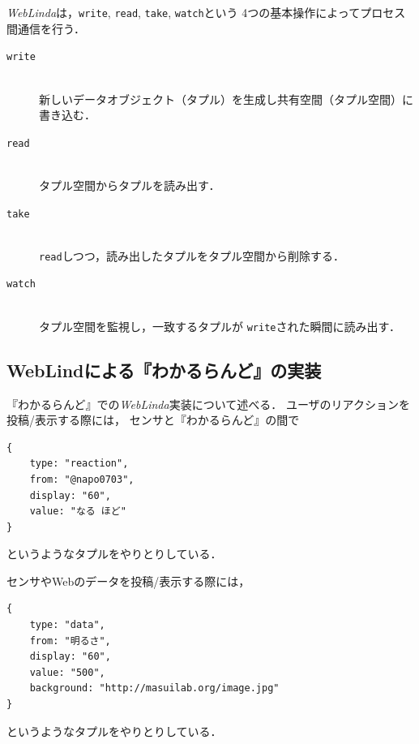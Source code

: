 \textit{WebLinda}は，\texttt{write}, \texttt{read}, \texttt{take}, \texttt{watch}という
4つの基本操作によってプロセス間通信を行う．

\vspace{2mm}
\begin{description}
\item[\texttt{write}]\mbox{}\\
新しいデータオブジェクト（タプル）を生成し共有空間（タプル空間）に書き込む．
\item[\texttt{read}]\mbox{}\\
タプル空間からタプルを読み出す．
\item[\texttt{take}]\mbox{}\\
\texttt{read}しつつ，読み出したタプルをタプル空間から削除する．
\item[\texttt{watch}]\mbox{}\\
タプル空間を監視し，一致するタプルが
\texttt{write}された瞬間に読み出す．
\end{description}

\subsection{WebLindによる『わかるらんど』の実装}

『わかるらんど』での\textit{WebLinda}実装について述べる．
ユーザのリアクションを投稿/表示する際には，
センサと『わかるらんど』の間で

\begin{lstlisting}
{
    type: "reaction",
    from: "@napo0703",
    display: "60",
    value: "なる ほど"
}
\end{lstlisting}
というようなタプルをやりとりしている．

センサやWebのデータを投稿/表示する際には，
\begin{lstlisting}
{
    type: "data",
    from: "明るさ",
    display: "60",
    value: "500",
    background: "http://masuilab.org/image.jpg"
}
\end{lstlisting}
というようなタプルをやりとりしている．

